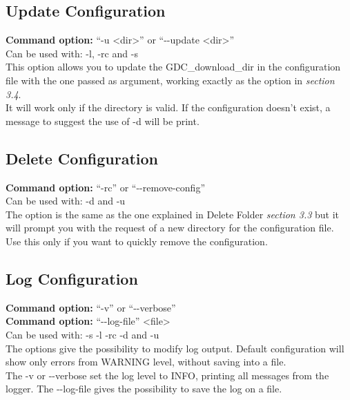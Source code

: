 \documentclass[hidelinks,12pt]{article}
\begin{document}
\subsection{Update Configuration}
\textbf{Command option:} ``-u <dir>'' or ``-\hspace{0.1 pt}-update <dir>''
\vspace{10 pt}
\\Can be used with: -l, -rc and -s\\
This option allows you to update the GDC\_download\_dir in the configuration file with the one passed as argument, working exactly as the option in \textit{section 3.4}. \\ It will work only if the directory is valid. If the configuration doesn't exist, a message to suggest the use of -d will be print.


\subsection{Delete Configuration}
\textbf{Command option:} ``-rc'' or ``-\hspace{0.1 pt}-remove-config''
\vspace{10 pt}
\\Can be used with: -d and -u\\
The option is the same as the one explained in Delete Folder \textit{section 3.3} but it will prompt you with the request of a new directory for the configuration file.\\ Use this only if you want to quickly remove the configuration.

\subsection{Log Configuration}
\textbf{Command option:} ``-v'' or ``-\hspace{0.1 pt}-verbose''\\
\textbf{Command option:} ``-\hspace{0.1 pt}-log-file'' <file>
\vspace{10 pt}
\\Can be used with: -s -l -rc -d and -u\\
The options give the possibility to modify log output. Default configuration will show only errors from WARNING level, without saving into a file.\\
The -v or -\hspace{0.1 pt}-verbose set the log level to INFO, printing all messages from the logger.
The -\hspace{0.1 pt}-log-file gives the possibility to save the log on a file.
\end{document}
